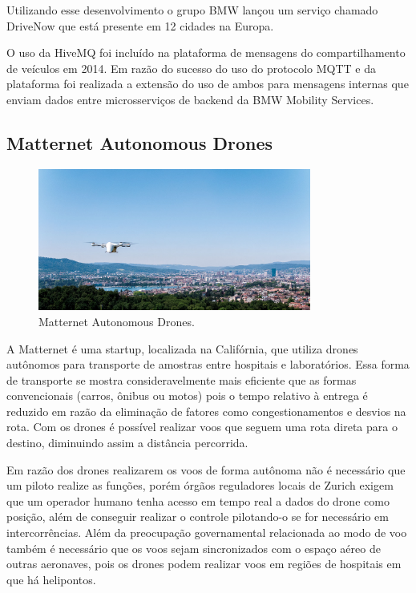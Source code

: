 \documentclass[12pt, a4paper]{article}
\begin{document}
        Utilizando esse desenvolvimento o grupo BMW lançou um serviço chamado DriveNow que está presente em 12 cidades na Europa.
        \cite{HiveMQBMW}
        
        O uso da HiveMQ foi incluído na plataforma de mensagens do compartilhamento de veículos em 2014. Em razão do sucesso do uso do protocolo MQTT e da plataforma foi realizada a extensão do uso de ambos para mensagens internas que enviam dados entre microsserviços de backend da BMW Mobility Services.  
        \cite{HiveMQBMW}
        
    \subsection{Matternet Autonomous Drones}\label{Matternet Autonomous Drones}
    
    \begin{figure}[h!]
        \centering
        \includegraphics[width=0.8\textwidth]{images/matternet-zurich.jpg}
        \caption{Matternet Autonomous Drones.}
        \label{fig:Matternet_Autonomous_Drones}
    \end{figure}
    
        A Matternet é uma startup, localizada na Califórnia, que utiliza drones autônomos para transporte de amostras entre hospitais e laboratórios. Essa forma de transporte se mostra consideravelmente mais eficiente que as formas convencionais (carros, ônibus ou motos) pois o tempo relativo à entrega é reduzido em razão da eliminação de fatores como congestionamentos e desvios na rota. Com os drones é possível realizar voos que seguem uma rota direta para o destino, diminuindo assim a distância percorrida.
        \cite{HiveMQDrone}
        
        Em razão dos drones realizarem os voos de forma autônoma não é necessário que um piloto realize as funções, porém órgãos reguladores locais de Zurich exigem que um operador humano tenha acesso em tempo real a dados do drone como posição, além de conseguir realizar o controle pilotando-o se for necessário em intercorrências. Além da preocupação governamental relacionada ao modo de voo também é necessário que os voos sejam sincronizados com o espaço aéreo de outras aeronaves, pois os drones podem realizar voos em regiões de hospitais em que há helipontos.
        \cite{HiveMQDrone}
        
\end{document}
